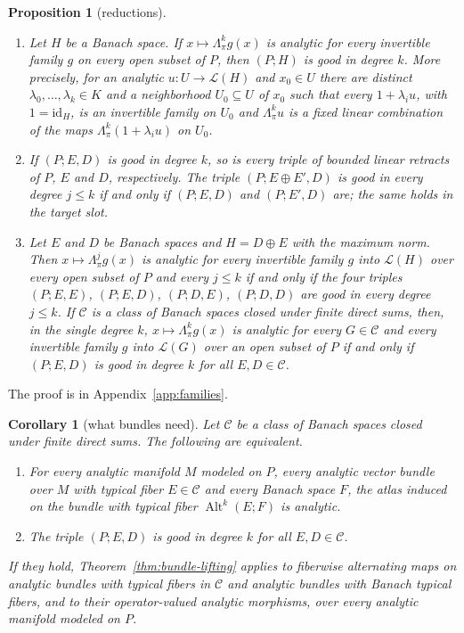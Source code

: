 \documentclass[11pt]{amsart}
\newtheorem{proposition}[theorem]{Proposition}
\newtheorem{corollary}[theorem]{Corollary}
\theoremstyle{definition}
\theoremstyle{remark}
\numberwithin{equation}{section}
\newcommand{\cL}{\mathcal L}
\newcommand{\Alt}{\operatorname{Alt}}
\newcommand{\id}{\mathrm{id}}
\newcommand{\cC}{\mathcal{C}}
\theoremstyle{plain}
\theoremstyle{definition}
\theoremstyle{plain}
\begin{document}
\begin{proposition}[reductions]\label{fam2:prop:reductions}
\begin{enumerate}
\item Let $H$ be a Banach space. If $x\mapsto\Lambda^k_\pi g(x)$ is analytic for every invertible family $g$ on every open
subset of $P$, then $(P;H)$ is good in degree $k$. More precisely, for an analytic $u\colon U\to\cL(H)$ and $x_0\in U$ there
are distinct $\lambda_0,\dots,\lambda_k\in K$ and a neighborhood $U_0\subseteq U$ of $x_0$ such that every $1+\lambda_iu$,
with $1=\id_H$, is an invertible family on $U_0$ and $\Lambda^k_\pi u$ is a fixed linear combination of the maps
$\Lambda^k_\pi(1+\lambda_iu)$ on $U_0$.
\item If $(P;E,D)$ is good in degree $k$, so is every triple of bounded linear retracts of $P$, $E$ and $D$, respectively.
The triple $(P;E\oplus E',D)$ is good in every degree $j\le k$ if and only if $(P;E,D)$ and $(P;E',D)$ are; the same holds
in the target slot.
\item Let $E$ and $D$ be Banach spaces and $H=D\oplus E$ with the maximum norm. Then $x\mapsto\Lambda^j_\pi g(x)$ is analytic
for every invertible family $g$ into $\cL(H)$ over every open subset of $P$ and every $j\le k$ if and only if
the four triples $(P;E,E)$, $(P;E,D)$, $(P;D,E)$, $(P;D,D)$ are good in every degree $j\le k$. If $\cC$ is a class of Banach spaces closed
under finite direct sums, then, in the single degree $k$, $x\mapsto\Lambda^k_\pi g(x)$ is analytic for every $G\in\cC$ and
every invertible family $g$ into $\cL(G)$ over an open subset of $P$ if and only if $(P;E,D)$ is good in degree $k$ for
all $E,D\in\cC$.
\end{enumerate}
\end{proposition}

The proof is in Appendix~\ref{app:families}.

\begin{corollary}[what bundles need]\label{fam2:cor:bundles}
Let $\cC$ be a class of Banach spaces closed under finite direct sums. The following are equivalent.
\begin{enumerate}
\item For every analytic manifold $M$ modeled on $P$, every analytic vector bundle over $M$ with typical fiber $E\in\cC$ and
every Banach space $F$, the atlas induced on the bundle with typical fiber $\Alt^k(E;F)$ is analytic.
\item The triple $(P;E,D)$ is good in degree $k$ for all $E,D\in\cC$.
\end{enumerate}
If they hold, Theorem~\ref{thm:bundle-lifting} applies to fiberwise alternating maps on analytic bundles with typical
fibers in $\cC$ and analytic bundles with Banach typical fibers, and to their operator-valued analytic morphisms, over every
analytic manifold modeled on $P$.
\end{corollary}
\end{document}
